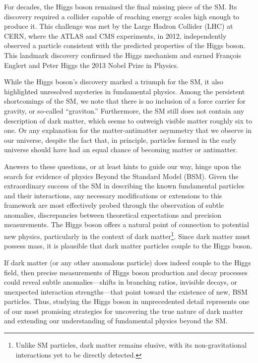 

For decades, the Higgs boson remained the final missing piece of the SM. Its discovery required a collider capable of reaching energy scales high enough to produce it. This challenge was met by the Large Hadron Collider (LHC) at CERN, where the ATLAS and CMS experiments, in 2012, independently observed a particle consistent with the predicted properties of the Higgs boson. This landmark discovery confirmed the Higgs mechanism and earned François Englert and Peter Higgs the 2013 Nobel Prize in Physics.

While the Higgs boson’s discovery marked a triumph for the SM, it also highlighted unresolved mysteries in fundamental physics. Among the persistent shortcomings of the SM, we note that there is no inclusion of a force carrier for gravity, or so-called ``graviton.'' Furthermore, the SM still does not contain any description of dark matter, which seems to outweigh visible matter roughly six to one. Or any explanation for the matter-antimatter asymmetry that we observe in our universe, despite the fact that, in principle, particles formed in the early universe should have had an equal chance of becoming matter or antimatter.

Answers to these questions, or at least hints to guide our way, hinge upon the search for evidence of physics Beyond the Standard Model (BSM). Given the extraordinary success of the SM in describing the known fundamental particles and their interactions, any necessary modifications or extensions to this framework are most effectively probed through the observation of subtle anomalies, discrepancies between theoretical expectations and precision measurements. The Higgs boson offers a natural point of connection to potential new physics, particularly in the context of dark matter\footnote{Unlike SM particles, dark matter remains elusive, with its non-gravitational interactions yet to be directly detected.}. Since dark matter must possess mass, it is plausible that dark matter particles couple to the Higgs boson.

If dark matter (or any other anomalous particle) does indeed couple to the Higgs field, then precise measurements of Higgs boson production and decay processes could reveal subtle anomalies—shifts in branching ratios, invisible decays, or unexpected interaction strengths—that point toward the existence of new, BSM particles. Thus, studying the Higgs boson in unprecedented detail represents one of our most promising strategies for uncovering the true nature of dark matter and extending our understanding of fundamental physics beyond the SM.



